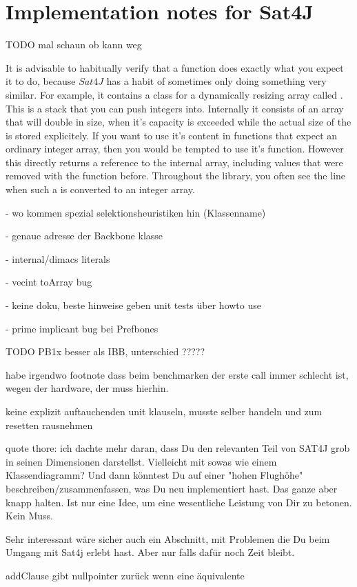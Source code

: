 \section{Implementation notes for Sat4J}




TODO mal schaun ob kann weg


It is advisable to habitually verify that a function does exactly what you expect it to do, because $Sat4J$ has a habit of sometimes only doing something very similar. For example, it contains a class for a dynamically resizing array called . This is a stack that you can push integers into. Internally it consists of an array that will double in size, when it's capacity is exceeded while the actual size of the  is stored explicitely. If you want to use it's content in functions that expect an ordinary integer array, then you would be tempted to use it's  function. However this directly returns a reference to the internal array, including values that were removed with the  function before. Throughout the library, you often see the line  when such a  is converted to an integer array. 

- wo kommen spezial selektionsheuristiken hin (Klassenname)

- genaue adresse der Backbone klasse

- internal/dimacs literals

- vecint toArray bug

- keine doku, beste hinweise geben unit tests über howto use

- prime implicant bug bei Prefbones

TODO PB1x besser als IBB, unterschied ?????

habe irgendwo footnote dass beim benchmarken der erste call immer schlecht ist, wegen der hardware, der muss hierhin.

keine explizit auftauchenden unit klauseln, musste selber handeln und zum resetten rausnehmen

quote thore: ich dachte mehr daran, dass Du den relevanten Teil von SAT4J grob in seinen Dimensionen darstellst. Vielleicht mit sowas wie einem Klassendiagramm? Und dann könntest Du auf einer "hohen Flughöhe" beschreiben/zusammenfassen, was Du neu implementiert hast. Das ganze aber knapp halten. Ist nur eine Idee, um eine wesentliche Leistung von Dir zu betonen. Kein Muss.

Sehr interessant wäre sicher auch ein Abschnitt, mit Problemen die Du beim Umgang mit Sat4j erlebt hast. Aber nur falls dafür noch Zeit bleibt. 


addClause gibt nullpointer zurück wenn eine äquivalente 